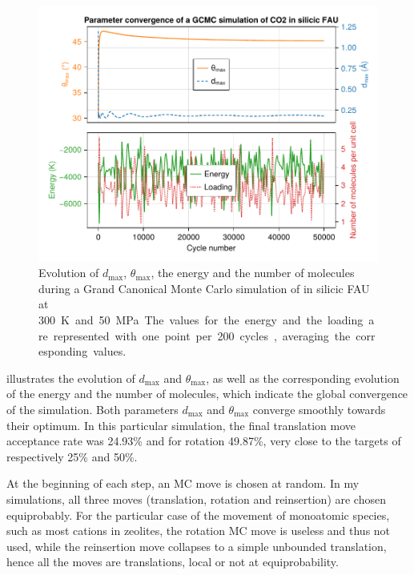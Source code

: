 \documentclass[main.tex]{subfiles}
\begin{document}
\begin{figure}
	\centering
	\includegraphics[width=\linewidth]{figures/gcmc/parameterconvergence.pdf}

	\caption{Evolution of $d_{\max}$, $\theta_{\max}$, the energy and the number of molecules during a Grand Canonical Monte Carlo simulation of  in silicic FAU at \qty{300}K and \qty{50}{MPa}. The values for the energy and the loading are represented with one point per \num{200} cycles, averaging the corresponding values.}\label{fig:parameterconvergence}
\end{figure}

 illustrates the evolution of $d_{\max}$ and $\theta_{\max}$, as well as the corresponding evolution of the energy and the number of molecules, which indicate the global convergence of the simulation. Both parameters $d_{\max}$ and $\theta_{\max}$ converge smoothly towards their optimum. In this particular simulation, the final translation move acceptance rate was \num{24.93}\% and for rotation \num{49.87}\%, very close to the targets of respectively \num{25}\% and \num{50}\%.

At the beginning of each step, an MC move is chosen at random. In my simulations, all three moves (translation, rotation and reinsertion) are chosen equiprobably. For the particular case of the movement of monoatomic species, such as most cations in zeolites, the rotation MC move is useless and thus not used, while the reinsertion move collapses to a simple unbounded translation, hence all the moves are translations, local or not at equiprobability.
\end{document}
